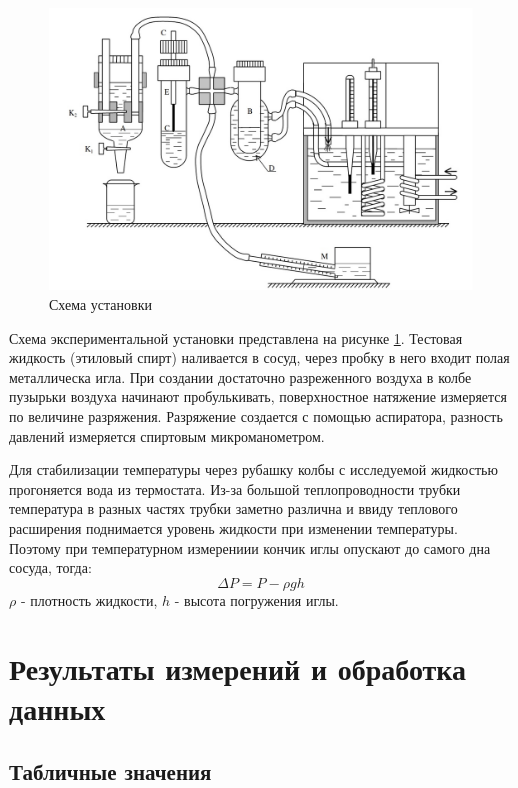 \documentclass[a4paper,12pt]{article} %
\begin{document}
\begin{figure}[h!]
\begin{center}
\includegraphics[width=\textwidth]{установка.jpg}
\end{center}
\caption{Схема установки}\label{установка}
\end{figure}

Схема экспериментальной установки представлена на рисунке \ref{установка}.
Тестовая жидкость (этиловый спирт) наливается в сосуд, через пробку в него входит полая металлическа игла. При создании достаточно разреженного воздуха в колбе пузырьки воздуха начинают пробулькивать, поверхностное натяжение измеряется по величине разряжения. Разряжение создается с помощью аспиратора, разность давлений измеряется спиртовым микроманометром.

Для стабилизации температуры через рубашку колбы с исследуемой жидкостью прогоняется вода из термостата. Из-за большой теплопроводности трубки температура в разных частях трубки заметно различна и ввиду теплового расширения поднимается уровень жидкости при изменении температуры. Поэтому при температурном измерениии кончик иглы опускают до самого дна сосуда, тогда:
\begin{equation}\label{погружение}
\Delta P = P - \rho g h
\end{equation}
$\rho$ - плотность жидкости, $h$ - высота погружения иглы.

\newpage

\section{Результаты измерений и обработка данных}

\subsection*{Табличные значения}
\end{document}
